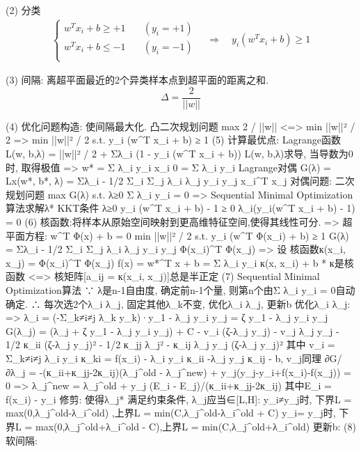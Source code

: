 \documentclass{article}
\begin{document}
			(2) 分类
			\begin{align*}\left \{ \begin{array}{cc}
				w^T x_i + b \ge +1    &\quad (y_i = +1)\\
				w^T x_i + b \le -1	&\quad (y_i = -1)\\
			    \end{array} \right.
				\quad\Rightarrow\quad y_i (w^T x_i + b) \ge 1
			\end{align*}

			(3) 间隔: 离超平面最近的2个异类样本点到超平面的距离之和.
					$$\Delta = \frac{2}{||w||}$$
					
			(4) 优化问题构造: 使间隔最大化. 凸二次规划问题
					max  2 / ||w||    <=>    min  ||w||² / 2
				=>	min		||w||² / 2
					s.t.	y_i (w^T x_i + b) ≥ 1
			(5) 计算最优点:
				Lagrange函数
					L(w, b,λ) = ||w||² / 2 + Σλ_i (1 - y_i (w^T x_i + b))
					L(w, b,λ)求导, 当导数为0时, 取得极值
					=>	w* = Σ λ_i y_i x_i		0 = Σ λ_i y_i
				Lagrange对偶
					G(λ) = Lx(w*, b*, λ) = Σλ_i - 1/2 Σ_i Σ_j λ_i λ_j y_i y_j x_i^T x_j
				对偶问题: 二次规划问题
					max		G(λ)
					s.t.	λ≥0		Σ λ_i y_i = 0
					=>	Sequential Minimal Optimization算法求解λ*
				KKT条件
					λ≥0    y_i (w^T x_i + b) - 1 ≥ 0    λ_i(y_i(w^T x_i + b) - 1) = 0
			(6) 核函数:将样本从原始空间映射到更高维特征空间,使得其线性可分.
				=>	超平面方程: w^T Φ(x) + b = 0
					min		||w||² / 2
					s.t.	y_i (w^T Φ(x_i) + b) ≥ 1
					G(λ) = Σλ_i - 1/2 Σ_i Σ_j λ_i λ_j y_i y_j Φ(x_i)^T Φ(x_j)
				=>	设 核函数к(x_i, x_j) = Φ(x_i)^T Φ(x_j)
					f(x) = w*^T x + b = Σ λ_i y_i к(x, x_i) + b
				*	к是核函数 <=> 核矩阵[a_ij = к(x_i, x_j)]总是半正定
			(7) Sequential Minimal Optimization算法
				∵	λ是n-1自由度, 确定前n-1个量, 则第n个由Σ λ_i y_i = 0自动确定.
				∴	每次选2个λ_i λ_j, 固定其他λ_k不变, 优化λ_i λ_j, 更新b
				优化λ_i λ_j:
				=>	λ_i = (-Σ_{k≠i≠j} λ_k y_k)·y_1 - λ_j y_i y_j = ζ y_1 - λ_j y_i y_j
					G(λ_j) = (λ_j + ζ y_1 - λ_j y_i y_j) + C - v_i (ζ-λ_j y_j) - v_j λ_j y_j
							- 1/2 к_ii (ζ-λ_j y_j)² - 1/2 к_jj λ_j² - к_ij λ_j y_j (ζ-λ_j y_j)²
					其中 v_i = Σ_{k≠i≠j} λ_i y_i к_ki = f(x_i) - λ_i y_i к_ii -λ_j y_j к_ij - b, v_j同理
					∂G/∂λ_j = -(к_ii+к_jj-2к_ij)(λ_j^old - λ_j^new) + y_j(y_j-y_i+f(x_i)-f(x_j)) = 0
				=>	λ_j^new = λ_j^old + y_j (E_i - E_j)/(к_ii+к_jj-2к_ij)		其中E_i = f(x_i) - y_i
				修剪: 使得λ_j* 满足约束条件, λ_j应当∈[L,H]:
					y_i≠y_j时,	下界L = max(0,λ_j^old-λ_i^old)	,上界L = min(C,λ_j^old-λ_i^old + C)
					y_i= y_j时,	下界L = max(0,λ_j^old+λ_i^old - C),上界L = min(C,λ_j^old+λ_i^old)
				更新b:
			(8)	软间隔:
\end{document}
